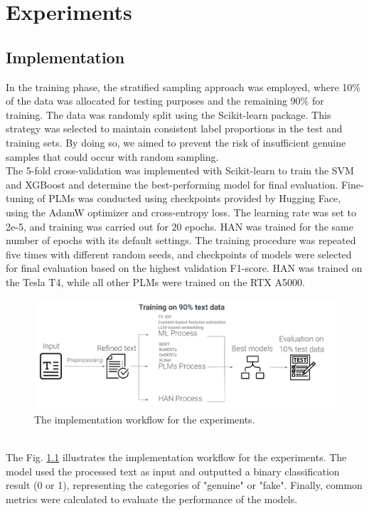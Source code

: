 \chapter{Experiments}
\label{ch:method}
\section{Implementation}
In the training phase, the stratified sampling approach was employed, where 10\% of the data was allocated for testing purposes and the remaining 90\% for training. The data was randomly split using the Scikit-learn package\cite{b31}. This strategy was selected to maintain consistent label proportions in the test and training sets. By doing so, we aimed to prevent the risk of insufficient genuine samples that could occur with random sampling.\\

The 5-fold cross-validation was implemented with Scikit-learn to train the SVM and XGBoost and determine the best-performing model for final evaluation. Fine-tuning of PLMs was conducted using checkpoints provided by Hugging Face, using the AdamW optimizer\cite{b32} and cross-entropy loss. The learning rate was set to 2e-5, and training was carried out for 20 epochs. HAN was trained for the same number of epochs with its default settings\cite{b33}. The training procedure was repeated five times with different random seeds, and checkpoints of models were selected for final evaluation based on the highest validation F1-score\cite{b34}. HAN was trained on the Tesla T4, while all other PLMs were trained on the RTX A5000.
\begin{figure}
  \centering
  \includegraphics[width=1\columnwidth]{img/training2.png}
  \caption{The implementation workflow for the experiments. } 
  \vspace{-0.4cm}
  \label{fig:training}
\end{figure}
\\
The Fig. \ref{fig:training} illustrates the implementation workflow for the experiments. The model used the processed text as input and outputted a binary classification result (0 or 1), representing the categories of "genuine" or "fake". Finally, common metrics were calculated to evaluate the performance of the models.


